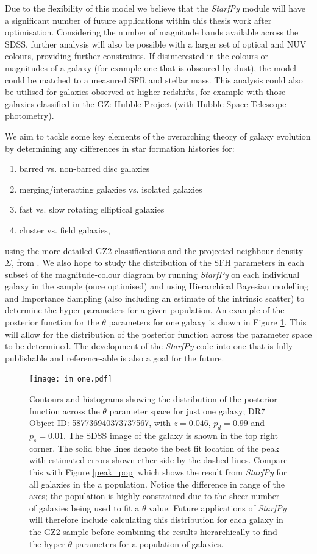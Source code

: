 \documentclass{mn2e}
\begin{document}
Due to the flexibility of this model we believe that the \emph{StarfPy} module will have a significant number of future applications within this thesis work after optimisation. Considering the number of magnitude bands available across the SDSS, further analysis will also be possible with a larger set of optical and NUV colours, providing further constraints. If disinterested in the colours or magnitudes of a galaxy (for example one that is obscured by dust), the model could be matched to a measured SFR and stellar mass. This analysis could also be utilised for galaxies observed at higher redshifts, for example with those galaxies classified in the GZ: Hubble Project (with Hubble Space Telescope photometry).

We aim to tackle some key elements of the overarching theory of galaxy evolution by determining any differences in star formation histories for:
\begin{enumerate}
\item barred vs. non-barred disc galaxies
\item merging/interacting galaxies vs. isolated galaxies
\item fast vs. slow rotating elliptical galaxies
\item cluster vs. field galaxies,
\end{enumerate}
using the more detailed GZ2 classifications and the projected neighbour density $\Sigma$, from \citet{Baldry06}. We also hope to study the distribution of the SFH parameters in each subset of the magnitude-colour diagram by running \emph{StarfPy} on each individual galaxy in the sample (once optimised) and using Hierarchical Bayesian modelling and Importance Sampling (also including an estimate of the intrinsic scatter) to determine the hyper-parameters for a given population. An example of the posterior function for the $\theta$ parameters for one galaxy is shown in Figure \ref{im_one}. This will allow for the distribution of the posterior function across the parameter space to be determined. The development of the \emph{StarfPy} code into one that is fully publishable and reference-able is also a goal for the future. 

\begin{figure}
\texttt{[image: im\_one.pdf]}
\caption{Contours and histograms showing the distribution of the posterior function across the $\theta$ parameter space for just one galaxy; DR7 Object ID: 587736940373737567, with $z=0.046$, $p_{d} = 0.99$ and $p_{s} = 0.01$. The SDSS image of the galaxy is shown in the top right corner. The solid blue lines denote the best fit location of the peak with estimated errors shown ether side by the dashed lines. Compare this with Figure \ref{peak_pop} which shows the result from \emph{StarfPy} for all galaxies in the a population. Notice the difference in range of the axes; the population is highly constrained due to the sheer number of galaxies being used to fit a $\theta$ value. Future applications of \emph{StarfPy} will therefore include calculating this distribution for each galaxy in the GZ2 sample before combining the results hierarchically to find the hyper $\theta$ parameters for a population of galaxies.}
\label{im_one}
\end{figure}
\end{document}
